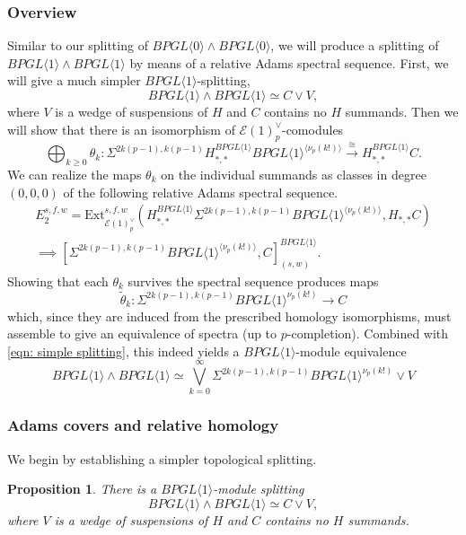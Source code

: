 \documentclass{amsart}
\newtheorem{proposition}[theorem]{Proposition}
\theoremstyle{plain}
\numberwithin{theorem}{section}
\numberwithin{equation}{section}
\numberwithin{figure}{section}
\newcommand{\0}{\langle 0 \rangle }
\begin{document}
\subsubsection{Overview}
Similar to our splitting of $BPGL \langle 0 \rangle \wedge BPGL \langle 0 \rangle$, we will produce a splitting of $BPGL \langle 1 \rangle \wedge BPGL \langle 1 \rangle$ by means of a relative Adams spectral sequence. First, we will give a much simpler $BPGL\langle 1 \rangle$-splitting,
\begin{equation}\label{eqn: simple splitting}
    BPGL \langle 1 \rangle \wedge BPGL \langle 1 \rangle \simeq C \vee V,
\end{equation}
    where $V$ is a wedge of suspensions of $H$ and $C$ contains no $H$ summands. Then we will show that there is an isomorphism of $\mathcal{E}(1)^\vee_p$-comodules
\[\bigoplus_{k \geq 0} \theta_k:\Sigma^{2k(p-1), k(p-1)}H_{*,*}^{BPGL\langle 1\rangle}BPGL \langle 1 \rangle^{\langle \nu _p(k!) \rangle}  \xrightarrow{\cong}H_{*,*}^{BPGL\langle 1\rangle}C.\]
We can realize the maps $\theta_k$ on the individual summands as classes in degree $(0,0,0)$ of the following relative Adams spectral sequence.
\begin{align*}
    E_2^{s,f,w} = \text{Ext}^{s,f,w}_{\mathcal{E}(1)^\vee_p}\left(H_{*,*}^{BPGL \langle 1 \rangle}\Sigma^{2k(p-1), k(p-1)}BPGL \langle 1 \rangle^{\langle \nu_p(k!) \rangle}, H_{*,*}C\right) \\
    \implies [\Sigma^{2k(p-1), k(p-1)}BPGL \langle 1 \rangle^{\langle \nu_p(k!)\rangle}, C]^{BPGL \langle 1 \rangle}_{(s,w)}.
\end{align*}  
Showing that each $\theta_k$ survives the spectral sequence produces maps
\[\tilde{\theta}_k:\Sigma^{2k(p-1), k(p-1)}BPGL \langle 1 \rangle^{\nu_p(k!)} \to C \]
which, since they are induced from the prescribed homology isomorphisms, must assemble to give an equivalence of spectra (up to $p$-completion). Combined with \cref{eqn: simple splitting}, this indeed yields a $BPGL\langle 1 \rangle$-module equivalence
\[BPGL\langle 1 \rangle \wedge BPGL\langle 1 \rangle \simeq \bigvee\limits_{k=0}^{\infty}\Sigma^{2k(p-1), k(p-1)}BPGL \langle 1 \rangle^{\nu_p(k!)} \vee V  \]

\subsubsection{Adams covers and relative homology}
We begin by establishing a simpler topological splitting.
\begin{proposition}
\label{prop:BPGL1SplittingBeta}
    There is a $BPGL\langle 1 \rangle$-module splitting
    \[BPGL \langle 1 \rangle \wedge BPGL \langle 1 \rangle \simeq C \vee V,\]
    where $V$ is a wedge of suspensions of $H$ and $C$ contains no $H$ summands.
\end{proposition}
\end{document}
